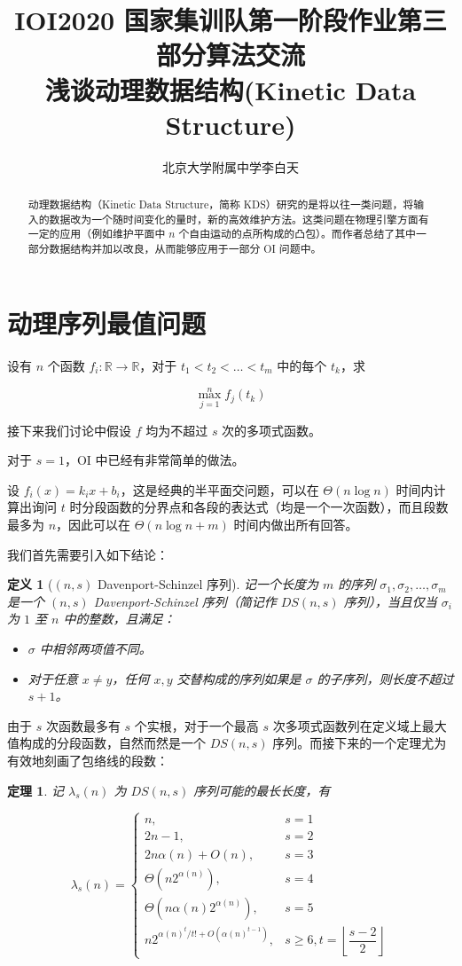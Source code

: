 \documentclass[12pt]{ctexart}
\title{%
IOI2020 国家集训队第一阶段作业第三部分算法交流\\
\large 浅谈动理数据结构(Kinetic Data Structure)}
\author{北京大学附属中学\quad 李白天}
\newtheorem{Def}{\hspace{2em}定义}
\newtheorem{Thm}{\hspace{2em}定理}
\begin{document}
\maketitle

\begin{abstract}
动理数据结构（Kinetic Data Structure，简称 KDS）研究的是将以往一类问题，将输入的数据改为一个随时间变化的量时，新的高效维护方法。这类问题在物理引擎方面有一定的应用（例如维护平面中 $n$ 个自由运动的点所构成的凸包）。而作者总结了其中一部分数据结构并加以改良，从而能够应用于一部分 OI 问题中。
\end{abstract}

\section{动理序列最值问题}

设有 $n$ 个函数 $f_i : \mathbb R \rightarrow \mathbb R$，对于 $t_1 < t_2 < \dots < t_m$ 中的每个 $t_k$，求

$$
\max_{j=1}^n f_j(t_k)
$$

接下来我们讨论中假设 $f$ 均为不超过 $s$ 次的多项式函数。

对于 $s=1$，OI 中已经有非常简单的做法。

设 $f_i(x) = k_i x + b_i$，这是经典的半平面交问题，可以在 $\Theta(n\log n)$ 时间内计算出询问 $t$ 时分段函数的分界点和各段的表达式（均是一个一次函数），而且段数最多为 $n$，因此可以在 $\Theta(n\log n + m)$ 时间内做出所有回答。

我们首先需要引入如下结论：

\begin{Def}[$(n, s)$ Davenport-Schinzel 序列]
记一个长度为 $m$ 的序列 $\sigma_1, \sigma_2, \dots, \sigma_m$ 是一个 $(n, s)$ Davenport-Schinzel 序列（简记作 $DS(n, s)$ 序列），当且仅当 $\sigma_i$ 为 $1$ 至 $n$ 中的整数，且满足：
\begin{itemize}
\item $\sigma$ 中相邻两项值不同。
\item 对于任意 $x\neq y$，任何 $x, y$ 交替构成的序列如果是 $\sigma$ 的子序列，则长度不超过 $s+1$。
\end{itemize}
\end{Def}

由于 $s$ 次函数最多有 $s$ 个实根，对于一个最高 $s$ 次多项式函数列在定义域上最大值构成的分段函数，自然而然是一个 $DS(n,s)$ 序列。而接下来的一个定理尤为有效地刻画了包络线的段数：

\begin{Thm}
记 $\lambda_s(n)$ 为 $DS(n, s)$ 序列可能的最长长度，有

$$
\lambda_s(n) = \begin{cases}
n, & s = 1 \\
2n - 1, & s = 2\\
2n\alpha(n) + O(n), & s = 3\\
\Theta(n 2^{\alpha(n)}), & s = 4\\
\Theta(n\alpha(n) 2^{\alpha(n)}), & s = 5\\
n2^{\alpha(n)^t/t! + O(\alpha(n)^{t-1})}, & s\ge 6, t = \left\lfloor \dfrac {s-2}2\right \rfloor
\end{cases}
$$
\end{Thm}
\end{document}
